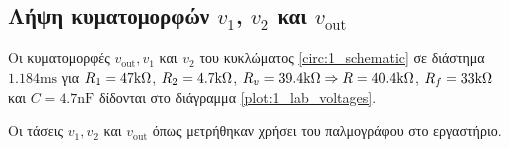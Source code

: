 \subsection{Λήψη κυματομορφών $v_1$, $v_2$ και $v_{\mathrm{out}}$}
		Οι κυματομορφές $v_{\mathrm{out}}, v_1$ και $v_2$ του κυκλώματος \ref{circ:1_schematic} σε διάστημα  $1.184\unit{\milli\second}$ για $R_1=47\kohm$, $R_2=4.7\kohm$, $R_v=39.4\kohm\Rightarrow R=40.4\kohm$, $R_f=33\kohm$ και $C=4.7\unit{\nano\farad}$ δίδονται στο διάγραμμα \ref{plot:1_lab_voltages}.

		\begin{chart}[H]
			\begin{center}
				
				\caption{Οι τάσεις $v_1, v_2$ και $v_{\mathrm{out}}$ όπως μετρήθηκαν χρήσει του παλμογράφου στο εργαστήριο.}
				\label{plot:1_lab_voltages}
			\end{center}
		\end{chart}